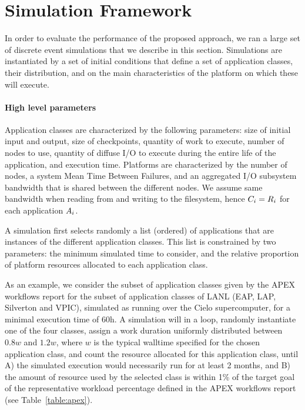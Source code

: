 
\section{Simulation Framework}
\label{sec:simulator}

In order to evaluate the performance of the proposed approach, we ran
a large set of discrete event simulations that we describe in this
section. Simulations are instantiated by a set of initial conditions
that define a set of application classes, their distribution, and on
the main characteristics of the platform on which these will execute.

\paragraph*{High level parameters}
Application classes are characterized by the following parameters:
size of initial input and output, size of checkpoints, quantity of
work to execute, number of nodes to use, quantity of diffuse I/O to
execute during the entire life of the application, and execution time.
Platforms are characterized by the number of nodes, a system Mean Time
Between Failures, and an aggregated I/O subsystem bandwidth that is
shared between the different nodes. We assume same bandwidth when
reading from and writing to the filesystem, hence $C_{i}=R_{i}$
for each application $A_{i}$.

A simulation first selects randomly a list (ordered) of applications
that are instances of the different application classes. This list is
constrained by two parameters: the minimum simulated time to consider,
and the relative proportion of platform resources allocated to each
application class.

As an example, we consider the subset of application classes given by
the APEX workflows report for the subset of application classes of
LANL (EAP, LAP, Silverton and VPIC), simulated as running over the
Cielo supercomputer, for a minimal execution time of 60h. A simulation
will in a loop, randomly instantiate one of the four classes, assign a
work duration uniformly distributed between $0.8w$ and $1.2w$, where
$w$ is the typical walltime specified for the chosen application
class, and count the resource allocated for this application class,
until A) the simulated execution would necessarily run for at least 2
months, and B) the amount of resource used by the selected class is
within 1\% of the target goal of the representative workload
percentage defined in the APEX workflows report (see
Table~\ref{table:apex}).

